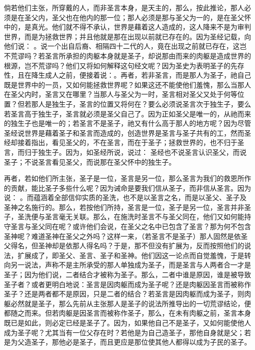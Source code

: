 倘若他们主张，所穿戴的人，而非圣言本身，是天主的，那么，按此推论，那人必须是在圣父内，圣父也在他内的那一位；那人必须是那与圣父为一的，是在圣父怀中的，是真光。他们就不得不承认，世界是藉着这人造成的，这人降来不是为审判世界，而是为拯救世界；并且他就是那在出现以前就已存在的。因为圣经记载，向他们说： 。说一个出自后裔、相隔四十二代的人，竟在出现之前就已存在，这岂不荒谬吗？若圣言所承担的肉躯本身就是圣子，却说那由而来的肉躯是造成世界的根源，岂不荒谬吗？他们又将如何解释这句经文呢？因为圣史为表明圣子的先存性，且在降生成人之前，便接着说：。再者，若非圣言，而是那人为圣子，祂自己既是世界中的一员，又如何能拯救世界呢？如果这还不能使他们羞愧，那么当那人在圣父内时，圣言又在哪里？当那人与圣父为一时，圣言相对圣父又处于何等位置？但若那人是独生子，圣言的位置又将何在？要么必须说圣言次于独生子，要么若圣言高于独生子，圣言就必须是圣父自己了。因为正如圣父是唯一的，从祂而来的独生子也是唯一的；若圣言不是圣子，祂又有什么高于那人的地方呢？因为尽管圣经说世界是藉着圣子和圣言而造成的，创造世界是圣言与圣子共有的工，然而圣经却接着指出，看见圣父的，不在圣言，而在于圣子；拯救世界的，也不归于圣言，而归于独生子。因为，如圣经所说，说过： 圣经也不说圣言认识圣父，而说圣子；不说圣言看见圣父，而说那在圣父怀中的独生子。\par

再者，若如他们所主张，圣子是一位，圣言是另一位，那么圣言为我们的救恩所作的贡献，能比圣子多些什么呢？因为诫命是要我们信从圣子，而非信从圣言。因为说： 。而蕴涵着全部信仰实质的圣洗，也不是以圣言之名，而是以圣父、圣子及圣神之名施行的。那么，若按他们所持，圣言是一位，圣子是另一位，圣言并非圣子，圣洗便与圣言毫无关联。那么，在施洗时圣言不与圣父同在，他们又如何能持守圣言与圣父同在呢？或许他们会说，在圣父之名中已包含了圣言？那为何不包含圣神呢？难道圣神在圣父之外吗？这样一来，（若圣言不是圣子）那人固然是依圣父得名，但圣神却是依那人得名吗？于是，那不但没有扩展为，反而按照他们的说法，扩展成了，即圣父、圣言、圣子和圣神。他们因这一论点而自觉羞愧，于是转向另一说法，声称不是主所承受的那人单独成为圣子，而是圣言与人两者合一才是圣子；因为他们说，二者结合才被称为圣子。那么，二者中谁是原因，谁是被导致圣子者？或者更明白地说：圣言是因肉躯而成为圣子呢？还是肉躯因圣言而被称作圣子？还是两者都不是原因，只是二者的结合？若圣言是因肉躯而成为圣子，则肉躯必然就是圣子，那么先前从主张那人是圣子的说法所推导出的一切荒谬结论，便都随之而来。但若肉躯是因圣言而被称作圣子，那么，在未有肉躯之前，圣言本身既已是如此，则必定已经是圣子了。因为，如果他自己不是圣子，又如何能使他人成为圣子呢？尤其当有一位父存在时？若他是为自己造圣子，那他自身就是父；若是为父造圣子，那他必是圣子，而且更应是那位使其他人都得以成为子民的圣子。\par

